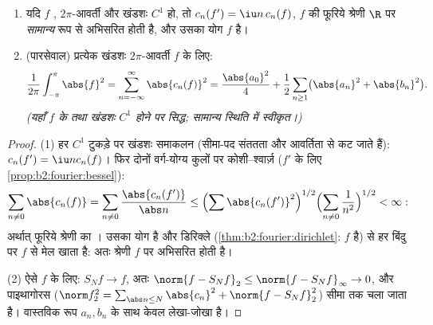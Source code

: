 \begin{theorem}[$C^1$ के लिए सामान्य अभिसरण; पारसेवाल]\label{thm:b2:fourier:parseval}
\begin{enumerate}
  \item यदि $f$ , $2\pi$-आवर्ती और खंडशः $C^1$ हो, तो $c_n(f') = \iu n\,c_n(f)$, $f$ की फूरिये
        श्रेणी $\R$ पर \emph{सामान्य} रूप से अभिसरित होती है, और उसका योग
        $f$ है।
  \item (पारसेवाल) प्रत्येक खंडशः  $2\pi$-आवर्ती $f$ के
        लिए:
        \[
        \frac{1}{2\pi}\int_{-\pi}^{\pi}\abs{f}^2
        = \sum_{n=-\infty}^{\infty} \abs{c_n(f)}^2
        = \frac{\abs{a_0}^2}{4} + \frac12\sum_{n\geq1}
        \bigl(\abs{a_n}^2 + \abs{b_n}^2\bigr).
        \]
        \emph{(यहाँ $f$ के  तथा खंडशः $C^1$ होने पर सिद्ध; सामान्य
        स्थिति में स्वीकृत।)}
\end{enumerate}
\end{theorem}

\begin{proof}
(1) हर $C^1$ टुकड़े पर खंडशः समाकलन (सीमा-पद संततता और आवर्तिता से कट जाते
हैं): $c_n(f') = \iu n c_n(f)$। फिर दोनों वर्ग-योग्य कुलों पर कोशी--श्वार्ज़ ($f'$ के लिए \cref{prop:b2:fourier:bessel}):
\[
\sum_{n \neq 0} \abs{c_n(f)} = \sum_{n\neq0}
\frac{\abs{c_n(f')}}{\abs n}
\leq \Bigl(\sum \abs{c_n(f')}^2\Bigr)^{1/2}
\Bigl(\sum_{n\neq0}\frac{1}{n^2}\Bigr)^{1/2} < \infty :
\]
अर्थात् फूरिये श्रेणी का । उसका योग  है और डिरिक्ले
(\cref{thm:b2:fourier:dirichlet}: $f$  है) से हर बिंदु पर $f$ से मेल खाता है: अतः श्रेणी $f$ पर
 अभिसरित होती है।

(2) ऐसे $f$ के लिए:  $S_N f \to f$, अतः $\norm{f - S_Nf}_2
\leq \norm{f - S_Nf}_\infty \to 0$, और पाइथागोरस ($\norm f_2^2 = \sum_{\abs n \leq N}\abs{c_n}^2 + \norm{f -
S_Nf}_2^2$) सीमा
तक चला जाता है। वास्तविक रूप $a_n, b_n$ के साथ केवल लेखा-जोखा है।
\end{proof}

